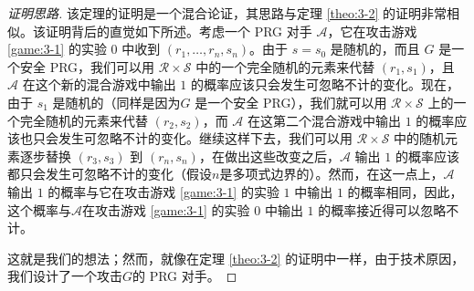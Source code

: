 \begin{proof}[证明思路]
该定理的证明是一个混合论证，其思路与定理 \ref{theo:3-2} 的证明非常相似。该证明背后的直觉如下所述。考虑一个 PRG 对手 $\mathcal A$，它在攻击游戏 \ref{game:3-1} 的实验 $0$ 中收到 $(r_1,\dots,r_n,s_n)$。由于 $s=s_0$ 是随机的，而且 $G$ 是一个安全 PRG，我们可以用 $\mathcal{R}\times\mathcal{S}$ 中的一个完全随机的元素来代替 $(r_1,s_1)$，且 $\mathcal A$ 在这个新的混合游戏中输出 $1$ 的概率应该只会发生可忽略不计的变化。现在，由于 $s_1$ 是随机的（同样是因为$G$ 是一个安全 PRG），我们就可以用 $\mathcal{R}\times\mathcal{S}$ 上的一个完全随机的元素来代替 $(r_2,s_2)$，而 $\mathcal A$ 在这第二个混合游戏中输出 $1$ 的概率应该也只会发生可忽略不计的变化。继续这样下去，我们可以用 $\mathcal{R}\times\mathcal{S}$ 中的随机元素逐步替换 $(r_3,s_3)$ 到 $(r_n,s_n)$，在做出这些改变之后，$\mathcal A$ 输出 $1$ 的概率应该都只会发生可忽略不计的变化（假设$n$是多项式边界的）。然而，在这一点上，$\mathcal A$ 输出 $1$ 的概率与它在攻击游戏 \ref{game:3-1} 的实验 $1$ 中输出 $1$ 的概率相同，因此，这个概率与$\mathcal A$在攻击游戏 \ref{game:3-1} 的实验 $0$ 中输出 $1$ 的概率接近得可以忽略不计。

这就是我们的想法；然而，就像在定理 \ref{theo:3-2} 的证明中一样，由于技术原因，我们设计了一个攻击$G$的 PRG 对手。
\end{proof}

